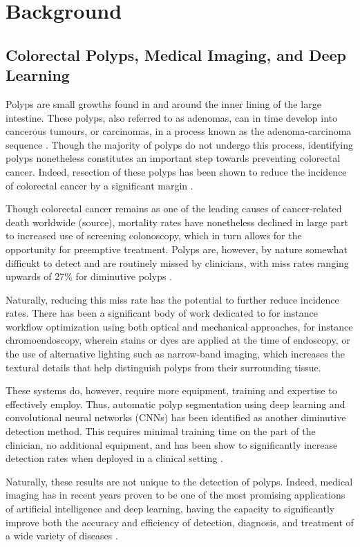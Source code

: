 \chapter{Background}
\setcounter{chapter}{2}
\section{Colorectal Polyps, Medical Imaging, and Deep Learning}
	Polyps are small growths found in and around the inner lining of the large intestine. These polyps, also referred to as adenomas, can in time develop into cancerous tumours, or carcinomas, in a process known as the adenoma-carcinoma sequence \cite{ACS}. Though the majority of polyps do not undergo this process, identifying polyps nonetheless constitutes an important step towards preventing colorectal cancer. Indeed, resection of these polyps has been shown to reduce the incidence of colorectal cancer by a significant margin \cite{resection}. 
	
	Though colorectal cancer remains as one of the leading causes of cancer-related death worldwide (source), mortality rates have nonetheless declined in large part to increased use of screening colonoscopy, which in turn allows for the opportunity for preemptive treatment. Polyps are, however, by nature somewhat difficukt to detect and are routinely missed by clinicians, with miss rates ranging upwards of 27\% for diminutive  polyps \cite{missrate1, missrate2}.
	
	Naturally, reducing this miss rate has the potential to further reduce incidence rates. There has been a significant body of work dedicated to for instance workflow optimization using both optical and mechanical approaches, for instance chromoendoscopy, wherein stains or dyes are applied at the time of endoscopy, or the use of alternative lighting such as narrow-band imaging, which increases the textural details that help distinguish polyps from their surrounding tissue. 
	
	These systems do, however, require more equipment, training and expertise to effectively employ. Thus, automatic polyp segmentation using deep learning and convolutional neural networks (CNNs) has been identified as another diminutive detection method. This requires minimal training time on the part of the clinician, no additional equipment, and has been show to significantly increase detection rates when deployed in a clinical setting \cite{polyp-success-story}. 
	
	Naturally, these results are not unique to the detection of polyps. Indeed, medical imaging has in recent years proven to be one of the most promising applications of artificial intelligence and deep learning, having the capacity to significantly improve both the accuracy and efficiency of detection, diagnosis, and treatment of a wide variety of diseases \cite{dl_medical_imaging}. 
	

